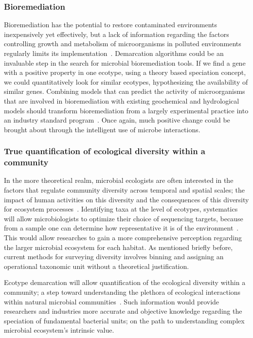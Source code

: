 \subsubsection*{Bioremediation}
Bioremediation has the potential to restore contaminated environments inexpensively yet effectively, but a lack of information regarding the factors controlling growth and metabolism of microorganisms in polluted environments regularly limits its implementation~\cite{lovley2003cleaning}.
Demarcation algorithms could be an invaluable step in the search for microbial bioremediation tools.
If we find a gene with a positive property in one ecotype, using a theory based speciation concept, we could quantitatively look for similar ecotypes, hypothesizing the availability of similar genes.
Combining models that can predict the activity of microorganisms that are involved in bioremediation with existing geochemical and hydrological models should transform bioremediation from a largely experimental practice into an industry standard program~\cite{lovley2003cleaning}.
Once again, much positive change could be brought about through the intelligent use of microbe interactions.

\subsubsection*{True quantification of ecological diversity within a community}
In the more theoretical realm, microbial ecologists are often interested in the factors that regulate community diversity across temporal and spatial scales; the impact of human activities on this diversity and the consequences of this diversity for ecosystem processes~\cite{bohannan2003new}.
Identifying taxa at the level of ecotypes, systematics will allow microbiologists to optimize their choice of sequencing targets, because from a sample one can determine how representative it is of the environment~\cite{bohannan2003new}.
This would allow researches to gain a more comprehensive perception regarding the larger microbial ecosystem for each habitat.
As mentioned briefly before, current methods for surveying diversity involves binning and assigning an operational taxonomic unit without a theoretical justification.

Ecotype demarcation will allow quantification of the ecological diversity within a community; a step toward understanding the plethora of ecological interactions within natural microbial communities~\cite{cohan2007systematics}.
Such information would provide researchers and industries more accurate and objective knowledge regarding the speciation of fundamental bacterial units; on the path to understanding complex microbial ecosystem's intrinsic value.


